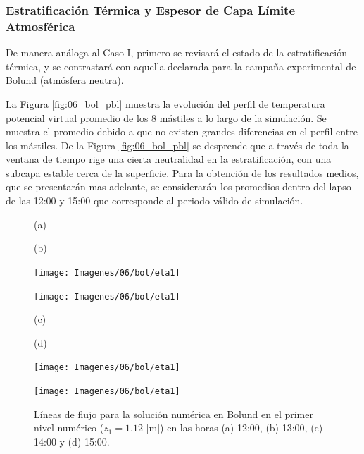 \subsubsection{Estratificación Térmica y Espesor de Capa Límite Atmosférica}
De manera análoga al Caso I, primero se revisará el estado de la estratificación térmica, y se contrastará con aquella declarada para la campaña experimental de Bolund (atmósfera neutra). 

La Figura \ref{fig:06_bol_pbl} muestra la evolución del perfil de temperatura potencial virtual promedio de los 8 mástiles a lo largo de la simulación. Se muestra el promedio debido a que no existen grandes diferencias en el perfil entre los mástiles. De la Figura \ref{fig:06_bol_pbl} se desprende que a través de toda la ventana de tiempo rige una cierta neutralidad en la estratificación, con una subcapa estable cerca de la superficie. Para la obtención de los resultados medios, que se presentarán mas adelante, se considerarán los promedios dentro del lapso de las 12:00 y 15:00 que corresponde al periodo válido de simulación.

\begin{figure}[H]
	\begin{minipage}{0.5\linewidth}
		\centering
		\hspace{1cm}(a)
	\end{minipage}%
	\begin{minipage}{0.5\linewidth}
		\centering
		\hspace{-1cm}(b)
	\end{minipage}%
	
	\begin{minipage}{0.5\linewidth}
		\centering
		\texttt{[image: Imagenes/06/bol/eta1]}%
	\end{minipage}%
	\begin{minipage}{0.5\linewidth}
		\centering
		\texttt{[image: Imagenes/06/bol/eta1]}%
	\end{minipage}%
	\vspace{1mm}
	
	\begin{minipage}{0.5\linewidth}
		\centering
		\hspace{1cm}(c)
	\end{minipage}%
	\begin{minipage}{0.5\linewidth}
		\centering
		\hspace{-1cm}(d)
	\end{minipage}%
	
	\begin{minipage}{0.5\linewidth}
		\centering
		\texttt{[image: Imagenes/06/bol/eta1]}%
	\end{minipage}%
	\begin{minipage}{0.5\linewidth}
		\centering
		\texttt{[image: Imagenes/06/bol/eta1]}%
	\end{minipage}%
	\caption{Líneas de flujo para la solución numérica en Bolund en el primer nivel numérico ($z_1 = 1.12$ [m]) en las horas (a) 12:00, (b) 13:00, (c) 14:00 y (d) 15:00.}
	\label{fig:06_bol_st}
\end{figure}

